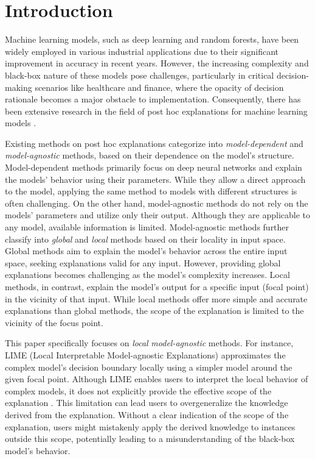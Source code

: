 \documentclass[runningheads]{llncs}
\begin{document}
\section{Introduction}
Machine learning models, such as deep learning and random forests,
have been widely employed in various industrial applications
due to their significant improvement in accuracy in recent years.
However,
the increasing complexity and black-box nature of these models pose challenges,
particularly in critical decision-making scenarios like healthcare and finance,
where the opacity of decision rationale becomes a major obstacle to
implementation.
Consequently,
there has been extensive research in the field of post hoc explanations
for machine learning models \cite{%
	ribeiro2016why,ribeiro2018anchors,radulovic2023bella,guidotti2018local}.

Existing methods on post hoc explanations categorize into
\emph{model-dependent} and \emph{model-agnostic} methods,
based on their dependence on the model's structure.
Model-dependent methods primarily focus on deep neural networks and
explain the models' behavior using their parameters.
While they allow a direct approach to the model,
applying the same method to models with different structures is often challenging.
On the other hand,
model-agnostic methods do not rely on the models' parameters and utilize only their output.
Although they are applicable to any model, available information is limited.
Model-agnostic methods further classify into
\emph{global} and \emph{local} methods based on their locality in input space.
Global methods aim to explain the model's behavior across the entire input space,
seeking explanations valid for any input.
However, providing global explanations becomes challenging as the model's complexity increases.
Local methods, in contrast, explain the model's output for a specific input
(focal point) in the vicinity of that input.
While local methods offer more simple and accurate explanations than global methods,
the scope of the explanation is limited to the vicinity of the focus point.

This paper specifically focuses on \emph{local} \emph{model-agnostic} methods.
For instance, LIME (Local Interpretable Model-agnostic Explanations)
\cite{ribeiro2016why} approximates the complex model's decision boundary
locally using a simpler model around the given focal point.
Although LIME enables users to interpret the local behavior of complex models,
it does not explicitly provide the effective scope of the explanation
\cite{ribeiro2018anchors}.
This limitation can lead users to overgeneralize the knowledge derived from the explanation.
Without a clear indication of the scope of the explanation,
users might mistakenly apply the derived knowledge to instances outside this scope,
potentially leading to a misunderstanding of the black-box model's behavior.
\end{document}
